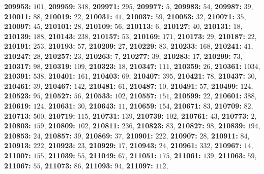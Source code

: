 \textsf{\bfseries 209953:} $101$, \textsf{\bfseries 209959:} $348$, \textsf{\bfseries 209971:} $295$, \textsf{\bfseries 209977:} $5$, \textsf{\bfseries 209983:} $54$, \textsf{\bfseries 209987:} $39$, \textsf{\bfseries 210011:} $88$, \textsf{\bfseries 210019:} $22$, \textsf{\bfseries 210031:} $41$, \textsf{\bfseries 210037:} $59$, \textsf{\bfseries 210053:} $32$, \textsf{\bfseries 210071:} $35$, \textsf{\bfseries 210097:} $45$, \textsf{\bfseries 210101:} $28$, \textsf{\bfseries 210109:} $56$, \textsf{\bfseries 210113:} $6$, \textsf{\bfseries 210127:} $40$, \textsf{\bfseries 210131:} $18$, \textsf{\bfseries 210139:} $188$, \textsf{\bfseries 210143:} $238$, \textsf{\bfseries 210157:} $53$, \textsf{\bfseries 210169:} $171$, \textsf{\bfseries 210173:} $29$, \textsf{\bfseries 210187:} $22$, \textsf{\bfseries 210191:} $253$, \textsf{\bfseries 210193:} $57$, \textsf{\bfseries 210209:} $27$, \textsf{\bfseries 210229:} $83$, \textsf{\bfseries 210233:} $168$, \textsf{\bfseries 210241:} $41$, \textsf{\bfseries 210247:} $28$, \textsf{\bfseries 210257:} $23$, \textsf{\bfseries 210263:} $7$, \textsf{\bfseries 210277:} $39$, \textsf{\bfseries 210283:} $17$, \textsf{\bfseries 210299:} $73$, \textsf{\bfseries 210317:} $98$, \textsf{\bfseries 210319:} $109$, \textsf{\bfseries 210323:} $18$, \textsf{\bfseries 210347:} $111$, \textsf{\bfseries 210359:} $26$, \textsf{\bfseries 210361:} $1034$, \textsf{\bfseries 210391:} $538$, \textsf{\bfseries 210401:} $161$, \textsf{\bfseries 210403:} $69$, \textsf{\bfseries 210407:} $395$, \textsf{\bfseries 210421:} $78$, \textsf{\bfseries 210437:} $30$, \textsf{\bfseries 210461:} $39$, \textsf{\bfseries 210467:} $142$, \textsf{\bfseries 210481:} $61$, \textsf{\bfseries 210487:} $10$, \textsf{\bfseries 210491:} $57$, \textsf{\bfseries 210499:} $124$, \textsf{\bfseries 210523:} $95$, \textsf{\bfseries 210527:} $56$, \textsf{\bfseries 210533:} $102$, \textsf{\bfseries 210557:} $151$, \textsf{\bfseries 210599:} $22$, \textsf{\bfseries 210601:} $388$, \textsf{\bfseries 210619:} $124$, \textsf{\bfseries 210631:} $30$, \textsf{\bfseries 210643:} $11$, \textsf{\bfseries 210659:} $154$, \textsf{\bfseries 210671:} $83$, \textsf{\bfseries 210709:} $82$, \textsf{\bfseries 210713:} $500$, \textsf{\bfseries 210719:} $115$, \textsf{\bfseries 210731:} $139$, \textsf{\bfseries 210739:} $102$, \textsf{\bfseries 210761:} $43$, \textsf{\bfseries 210773:} $2$, \textsf{\bfseries 210803:} $159$, \textsf{\bfseries 210809:} $102$, \textsf{\bfseries 210811:} $236$, \textsf{\bfseries 210823:} $83$, \textsf{\bfseries 210827:} $98$, \textsf{\bfseries 210839:} $194$, \textsf{\bfseries 210853:} $24$, \textsf{\bfseries 210857:} $39$, \textsf{\bfseries 210869:} $37$, \textsf{\bfseries 210901:} $222$, \textsf{\bfseries 210907:} $28$, \textsf{\bfseries 210911:} $84$, \textsf{\bfseries 210913:} $222$, \textsf{\bfseries 210923:} $23$, \textsf{\bfseries 210929:} $17$, \textsf{\bfseries 210943:} $24$, \textsf{\bfseries 210961:} $332$, \textsf{\bfseries 210967:} $14$, \textsf{\bfseries 211007:} $155$, \textsf{\bfseries 211039:} $55$, \textsf{\bfseries 211049:} $67$, \textsf{\bfseries 211051:} $175$, \textsf{\bfseries 211061:} $139$, \textsf{\bfseries 211063:} $59$, \textsf{\bfseries 211067:} $55$, \textsf{\bfseries 211073:} $86$, \textsf{\bfseries 211093:} $94$, \textsf{\bfseries 211097:} $112$, 
